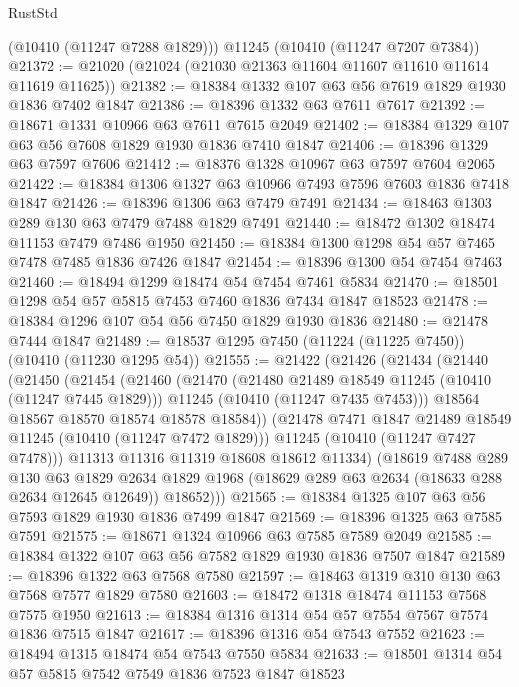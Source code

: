 \begin{lexlean}{RustStd}
\begin{coremodule}
      (@10410 (@11247 @7288 @1829)))
    @11245
    (@10410 (@11247 @7207 @7384))
@21372 := @21020 (@21024 (@21030 @21363 @11604 @11607 @11610 @11614 @11619 @11625))
@21382 := @18384 @1332 @107 @63 @56 @7619 @1829 @1930 @1836 @7402 @1847
@21386 := @18396 @1332 @63 @7611 @7617
@21392 := @18671 @1331 @10966 @63 @7611 @7615 @2049
@21402 := @18384 @1329 @107 @63 @56 @7608 @1829 @1930 @1836 @7410 @1847
@21406 := @18396 @1329 @63 @7597 @7606
@21412 := @18376 @1328 @10967 @63 @7597 @7604 @2065
@21422 := @18384 @1306 @1327 @63 @10966 @7493 @7596 @7603 @1836 @7418 @1847
@21426 := @18396 @1306 @63 @7479 @7491
@21434 := @18463 @1303 @289 @130 @63 @7479 @7488 @1829 @7491
@21440 := @18472 @1302 @18474 @11153 @7479 @7486 @1950
@21450 := @18384 @1300 @1298 @54 @57 @7465 @7478 @7485 @1836 @7426 @1847
@21454 := @18396 @1300 @54 @7454 @7463
@21460 := @18494 @1299 @18474 @54 @7454 @7461 @5834
@21470 := @18501 @1298 @54 @57 @5815 @7453 @7460 @1836 @7434 @1847 @18523
@21478 := @18384 @1296 @107 @54 @56 @7450 @1829 @1930 @1836
@21480 := @21478 @7444 @1847
@21489 := @18537 @1295 @7450 (@11224 (@11225 @7450)) (@10410 (@11230 @1295 @54))
@21555 := @21422
    (@21426
      (@21434
        (@21440
          (@21450
            (@21454
              (@21460
                (@21470
                  (@21480 @21489 @18549 @11245 (@10410 (@11247 @7445 @1829)))
                  @11245
                  (@10410 (@11247 @7435 @7453)))
                @18564
                @18567
                @18570
                @18574
                @18578
                @18584))
            (@21478 @7471 @1847 @21489 @18549 @11245 (@10410 (@11247 @7472 @1829)))
            @11245
            (@10410 (@11247 @7427 @7478)))
          @11313
          @11316
          @11319
          @18608
          @18612
          @11334)
        (@18619
          @7488
          @289
          @130
          @63
          @1829
          @2634
          @1829
          @1968
          (@18629 @289 @63 @2634 (@18633 @288 @2634 @12645 @12649))
          @18652)))
@21565 := @18384 @1325 @107 @63 @56 @7593 @1829 @1930 @1836 @7499 @1847
@21569 := @18396 @1325 @63 @7585 @7591
@21575 := @18671 @1324 @10966 @63 @7585 @7589 @2049
@21585 := @18384 @1322 @107 @63 @56 @7582 @1829 @1930 @1836 @7507 @1847
@21589 := @18396 @1322 @63 @7568 @7580
@21597 := @18463 @1319 @310 @130 @63 @7568 @7577 @1829 @7580
@21603 := @18472 @1318 @18474 @11153 @7568 @7575 @1950
@21613 := @18384 @1316 @1314 @54 @57 @7554 @7567 @7574 @1836 @7515 @1847
@21617 := @18396 @1316 @54 @7543 @7552
@21623 := @18494 @1315 @18474 @54 @7543 @7550 @5834
@21633 := @18501 @1314 @54 @57 @5815 @7542 @7549 @1836 @7523 @1847 @18523

\end{coremodule}
\end{lexlean}
